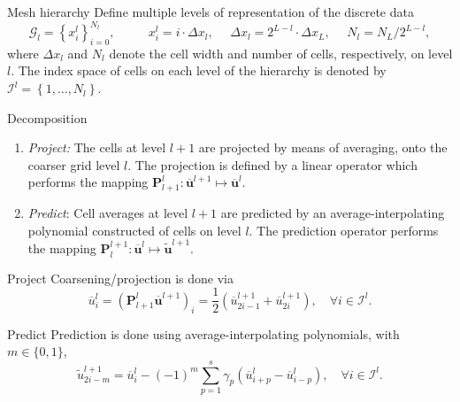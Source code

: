 \documentclass{beamer}
\begin{document}
\begin{frame}{Mesh hierarchy}
    Define multiple levels of representation of the discrete data
    \begin{equation*}
        \bm{\mathcal{G}}_{l} = \left\{ x_{i}^{l} \right\}_{i=0}^{N_{l}}, \text{ }
        \text{ } \text{ } \text{ } x_{i}^{l} = i \cdot \Delta x_{l}, \text{ }
        \text{ } \Delta x_{l} = 2^{L-l} \cdot \Delta x_{L}, \text{ } \text{ } N_{l} = N_{L}
        / 2^{L-l},
    \end{equation*}
    where $\Delta x_{l}$ and $N_{l}$ denote the cell width and number of cells,
    respectively, on level $l$.
    The index space of cells on each level of the hierarchy is denoted by
    $\bm{\mathcal{I}}^{l} = \left\{ 1,\dots,N_{l} \right\}$.
\end{frame}

\begin{frame}{Decomposition}
    \begin{enumerate}
        \item[] \textit{Project:} The cells at level $l+1$ are projected
            by means of averaging, onto the coarser grid
            level $l$. The projection is defined by a linear operator
            which performs the mapping $\bm{P}_{l+1}^{l} : \overline{\bm{u}}^{l+1}
            \mapsto \overline{\bm{u}}^{l}$. 
        \item[] \textit{Predict}: Cell averages at level $l+1$
            are predicted by an average-interpolating polynomial constructed
            of cells on level $l$. The prediction operator performs
            the mapping $\bm{P}_{l}^{l+1} : \overline{\bm{u}}^{l} \mapsto
            \tilde{\bm{u}}^{l+1}$. 
    \end{enumerate}
\end{frame}

\begin{frame}{Project}
    Coarsening/projection is done via
    \begin{equation}
        \overline{u}^{l}_{i} = \left( \bm{P}_{l+1}^{l}
        \overline{\bm{u}}^{l+1} \right)_{i} = \frac{1}{2} (
        \overline{u}^{l+1}_{2i-1} + \overline{u}^{l+1}_{2i} ), \quad \forall
        i \in \bm{\mathcal{I}}^{l}.
    \end{equation}
\end{frame}

\begin{frame}{Predict}
    Prediction is done using average-interpolating polynomials, with
    $m\in\{0,1\}$,
    \begin{equation*}
        \tilde{u}_{2i-m}^{l+1} = \overline{u}_{i}^{l} - (-1)^{m} \sum_{p=1}^{s} \gamma_{p} \left(
            \overline{u}^{l}_{i+p} - \overline{u}^{l}_{i-p} \right), \quad \forall i \in
            \bm{\mathcal{I}}^{l}.
        \label{prediction}
    \end{equation*}
\end{frame}
\end{document}
